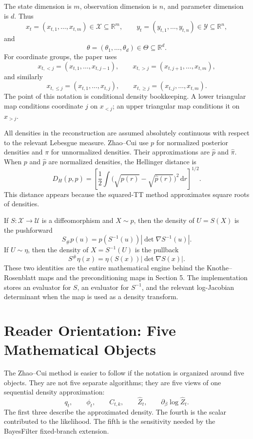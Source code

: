 \documentclass[11pt]{article}
\newcommand{\R}{\mathbb R}
\newcommand{\dd}{\,\mathrm d}
\begin{document}
The state dimension is \(m\), observation dimension is \(n\), and parameter
dimension is \(d\).  Thus
\[
    x_t=(x_{t,1},\ldots,x_{t,m})\in\mathcal X\subseteq\R^m,
    \qquad
    y_t=(y_{t,1},\ldots,y_{t,n})\in\mathcal Y\subseteq\R^n,
\]
and
\[
    \theta=(\theta_1,\ldots,\theta_d)\in\Theta\subseteq\R^d.
\]
For coordinate groups, the paper uses
\[
    x_{t,<j}=(x_{t,1},\ldots,x_{t,j-1}),\qquad
    x_{t,>j}=(x_{t,j+1},\ldots,x_{t,m}),
    \tag{N1}
\]
and similarly
\[
    x_{t,\le j}=(x_{t,1},\ldots,x_{t,j}),\qquad
    x_{t,\ge j}=(x_{t,j},\ldots,x_{t,m}).
    \tag{N2}
\]
The point of this notation is conditional density bookkeeping.  A lower
triangular map conditions coordinate \(j\) on \(x_{<j}\); an upper triangular
map conditions it on \(x_{>j}\).

All densities in the reconstruction are assumed absolutely continuous with
respect to the relevant Lebesgue measure.  Zhao--Cui use \(p\) for normalized
posterior densities and \(\pi\) for unnormalized densities.  Their
approximations are \(\widehat p\) and \(\widehat\pi\).  When \(p\) and
\(\widehat p\) are normalized densities, the Hellinger distance is
\[
    D_H(p,\widehat p)
    =
    \left[
    \frac12
    \int
    \bigl(\sqrt{p(r)}-\sqrt{\widehat p(r)}\bigr)^2\dd r
    \right]^{1/2}.
    \tag{N3}
\]
This distance appears because the squared-TT method approximates square roots
of densities.

If \(S:\mathcal X\to\mathcal U\) is a diffeomorphism and \(X\sim p\), then
the density of \(U=S(X)\) is the pushforward
\[
    S_\#p(u)
    =
    p(S^{-1}(u))\left|\det\nabla S^{-1}(u)\right|.
    \tag{N4}
\]
If \(U\sim\eta\), then the density of \(X=S^{-1}(U)\) is the pullback
\[
    S^\#\eta(x)
    =
    \eta(S(x))\left|\det\nabla S(x)\right|.
    \tag{N5}
\]
These two identities are the entire mathematical engine behind the
Knothe--Rosenblatt maps and the preconditioning maps in Section 5.  The
implementation stores an evaluator for \(S\), an evaluator for \(S^{-1}\), and
the relevant log-Jacobian determinant when the map is used as a density
transform.

\section{Reader Orientation: Five Mathematical Objects}

The Zhao--Cui method is easier to follow if the notation is organized around
five objects.  They are not five separate algorithms; they are five views of
one sequential density approximation:
\[
    q_t,\qquad \phi_t,\qquad C_{t,k},\qquad \widehat Z_t,
    \qquad \partial_\beta\log\widehat Z_t .
    \tag{P22-O1}
\]
The first three describe the approximated density.  The fourth is the scalar
contributed to the likelihood.  The fifth is the sensitivity needed by the
BayesFilter fixed-branch extension.
\end{document}
